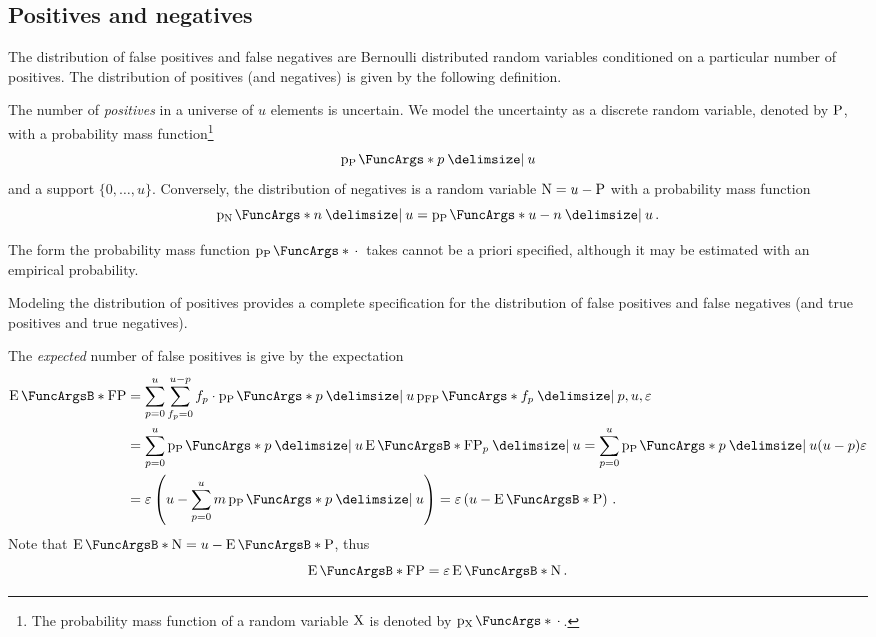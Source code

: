 \documentclass[ ../main.tex]{subfiles}
\begin{document}
\subsection{Positives and negatives}
The distribution of false positives and false negatives are Bernoulli distributed random variables conditioned on a particular number of positives. The distribution of positives (and negatives) is given by the following definition.
\begin{definition}
The number of \emph{positives} in a universe of $u$ elements is uncertain. We model the uncertainty as a discrete random variable, denoted by $\mathrm{P}$, with a probability mass function\footnote{The probability mass function of a random variable $\mathrm{X}$ is denoted by $\PDF{\,\cdot\,}[\RV{X}]$.}
\begin{equation}
    \PDF{p \Given u}[\RV{P}]
\end{equation}
and a support $\{0,\ldots,u\}$. Conversely, the distribution of negatives is a random variable $\mathrm{N} = u - \mathrm{P}$ with a probability mass function
\begin{equation}
    \PDF{n \Given u}[\RV{N}] = \PDF{u - n \Given u}[\RV{P}]\,.
\end{equation}
\end{definition}
The form the probability mass function $\PDF{\,\cdot\,}[\RV{P}]$ takes cannot be a priori specified, although it may be estimated with an empirical probability.

Modeling the distribution of positives provides a complete specification for the distribution of false positives and false negatives (and true positives and true negatives).
\begin{example}
The \emph{expected} number of false positives is give by the expectation
\begin{align}
    \Expect{\FP}
        &= \sum_{p=0}^{u} \sum_{f_p=0}^{u - p} f_p \cdot \PDF{p \Given u}[\RV{P}] \PDF{f_p \Given p, u, \fprate}[\FP]\\
        &= \sum_{p=0}^{u} \PDF{p \Given u}[\RV{P}] \Expect{\FP_p \Given u} = \sum_{p=0}^{u} \PDF{p \Given u}[\RV{P}] (u-p) \fprate\\
        &= \fprate\left(u - \sum_{p=0}^{u} m \PDF{p \Given u}[\RV{P}]\right) = \fprate\left(u - \Expect{\RV{P}}\right)\,.
\end{align}
Note that $\Expect{\RV{N}} = u - \Expect{\RV{P}}$, thus
\begin{equation}
    \Expect{\FP} = \fprate \Expect{\RV{N}}\,.
\end{equation}
\end{example}
\end{document}
